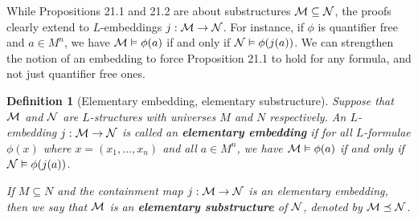 \documentclass[10pt]{article}
\theoremstyle{newstyle}
\newtheorem{defn}[thm]{Definition}
\begin{document}
While Propositions 21.1 and 21.2 are about substructures ${\cal M \subseteq N}$, the proofs 
clearly extend to $L$-embeddings $j : {\cal M} \to {\cal N}$. For instance, if 
$\phi$ is quantifier free and $a \in M^n$, we have ${\cal M} \vDash \phi(a)$ if and only if 
${\cal N} \vDash \phi(j(a))$. We can strengthen the notion of an embedding to force Proposition 21.1 
to hold for any formula, and not just quantifier free ones.

\begin{defn}[Elementary embedding, elementary substructure] 
Suppose that ${\cal M}$ and ${\cal N}$ are $L$-structures with universes $M$ and $N$ respectively. 
An $L$-embedding $j : {\cal M \to N}$ is called an {\bf elementary embedding} if for all 
$L$-formulae $\phi(x)$ where $x = (x_1, \dots, x_n)$ and all $a \in M^n$, we have 
${\cal M} \vDash \phi(a)$ if and only if ${\cal N} \vDash \phi(j(a))$.

If $M \subseteq N$ and the containment map $j : {\cal M} \to {\cal N}$ is an elementary embedding, then we say that ${\cal M}$ is an {\bf elementary substructure} of ${\cal N}$, denoted by 
${\cal M \preceq N}$.
\end{defn}
\end{document}
